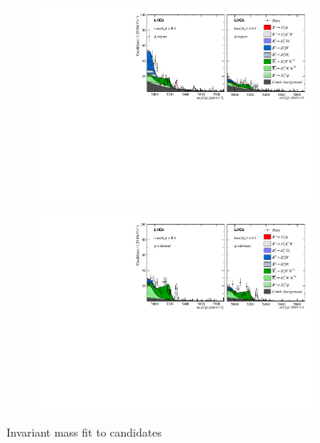 \begin{figure}[!h]
    \centering
    \begin{subfigure}[t]{0.85\textwidth}
        \includegraphics[width=1.0\textwidth]{figs/B2DsPhi/B2DsPhi_result_one.pdf}
    \end{subfigure}
    \begin{subfigure}[t]{0.85\textwidth}
        \includegraphics[width=1.0\textwidth]{figs/B2DsPhi/B2DsPhi_result_two.pdf}
    \end{subfigure}
    \caption{Invariant mass fit to \decay{\Bp}{\Dsp\phiz} candidates}
    \label{fig:B2DsPhi_Signal_Fit}
\end{figure}

